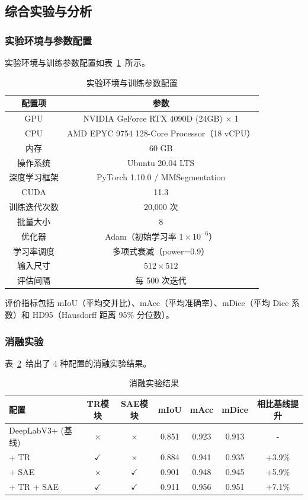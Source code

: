 \subsection{综合实验与分析}

\subsubsection{实验环境与参数配置}

实验环境与训练参数配置如表~\ref{tab:env_train_config}~所示。

\begin{table}[htbp]
\centering
\caption{实验环境与训练参数配置}
\label{tab:env_train_config}
\begin{tabular}{cc}
\toprule
配置项 & 参数 \\
\midrule
GPU & NVIDIA GeForce RTX 4090D (24GB) × 1 \\
CPU & AMD EPYC 9754 128-Core Processor（18 vCPU） \\
内存 & 60 GB \\
操作系统 & Ubuntu 20.04 LTS \\
深度学习框架 & PyTorch 1.10.0 / MMSegmentation \\
CUDA & 11.3 \\
\midrule
训练迭代次数 & 20,000 次 \\
批量大小 & 8 \\
优化器 & Adam（初始学习率 $1 \times 10^{-6}$） \\
学习率调度 & 多项式衰减（power=0.9） \\
输入尺寸 & $512 \times 512$ \\
评估间隔 & 每 500 次迭代 \\
\bottomrule
\end{tabular}
\end{table}

评价指标包括 mIoU（平均交并比）、mAcc（平均准确率）、mDice（平均 Dice 系数）和 HD95（Hausdorff 距离 95\% 分位数）。

\subsubsection{消融实验}

表~\ref{tab:ablation}~给出了 4 种配置的消融实验结果。

\begin{table}[htbp]
\centering
\caption{消融实验结果}
\label{tab:ablation}
\begin{tabular}{lcccccc}
\toprule
配置 & TR模块 & SAE模块 & mIoU & mAcc & mDice & 相比基线提升 \\
\midrule
DeepLabV3+ (基线) & $\times$ & $\times$ & 0.851 & 0.923 & 0.913 & - \\
+ TR & $\checkmark$ & $\times$ & 0.884 & 0.941 & 0.935 & +3.9\% \\
+ SAE & $\times$ & $\checkmark$ & 0.901 & 0.948 & 0.945 & +5.9\% \\
+ TR + SAE & $\checkmark$ & $\checkmark$ & 0.911 & 0.956 & 0.951 & +7.1\% \\
\bottomrule
\end{tabular}
\end{table}

